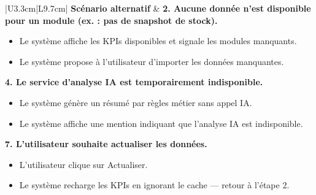 \documentclass[a4paper,12pt]{report}
\begin{document}
\begin{longtable}{|U{3.3cm}|L{9.7cm}|}
\hline
\textbf{Scénario alternatif} &
\textbf{2. Aucune donnée n'est disponible pour un module (ex. : pas de snapshot de stock).}
\begin{itemize}
    \item[2.1] Le système affiche les KPIs disponibles et signale les modules manquants.
    \item[2.2] Le système propose à l'utilisateur d'importer les données manquantes.
\end{itemize}
\textbf{4. Le service d'analyse IA est temporairement indisponible.}
\begin{itemize}
    \item[4.1] Le système génère un résumé par règles métier sans appel IA.
    \item[4.2] Le système affiche une mention indiquant que l'analyse IA est indisponible.
\end{itemize}
\textbf{7. L'utilisateur souhaite actualiser les données.}
\begin{itemize}
    \item[7.1] L'utilisateur clique sur Actualiser.
    \item[7.2] Le système recharge les KPIs en ignorant le cache --- retour à l'étape 2.
\end{itemize} 
\end{longtable}
\end{document}
